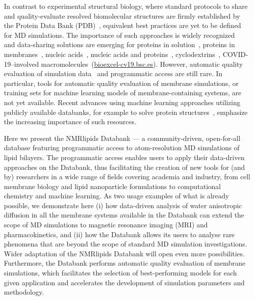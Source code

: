 \documentclass[fleqn,10pt]{wlscirep}
\begin{document}
In contrast to experimental structural biology, where standard protocols to share and quality-evaluate resolved biomolecular structures are firmly established by the Protein Data Bank (PDB)~\cite{montelione13}, equivalent best practices are yet to be defined for MD simulations. The importance of such approaches is widely recognized~\cite{feig99,tai04,silva06,abraham19,hildebrand19,hospital20,abriata20,espigares20} and data-sharing solutions are emerging for proteins in solution~\cite{meyer10,kamp10}, proteins in membranes~\cite{newport19,espigares20,leston22}, nucleic acids~\cite{hospital16}, nucleic acids and proteins~\cite{bekker20}, cyclodextrins~\cite{mixcoha16}, COVID-19--involved macromolecules~(\href{https://bioexcel-cv19.bsc.es}{bioexcel-cv19.bsc.es}). However, automatic quality evaluation of simulation data~\cite{meyer10,hospital16} and programmatic access are still rare. In particular, tools for automatic quality evaluation of membrane simulations, or training sets for machine learning models of membrane-containing systems, are not yet available. Recent advances using machine learning approaches utilizing publicly available databanks, for example to solve protein structures~\cite{jumper21}, emphasize the increasing importance of such resources. 

Here we present the NMRlipids Databank --- a community-driven, open-for-all database featuring programmatic access to atom-resolution MD simulations of lipid bilayers. The programmatic access enables users to apply their data-driven approaches on the Databank, thus facilitating the creation of new tools for (and by) researchers in a wide range of fields covering academia and industry, from cell membrane biology and lipid nanoparticle formulations to computational chemistry and machine learning. As two usage examples of what is already possible, we demonstrate here (i) how data-driven analysis of water anisotropic diffusion in all the membrane systems available in the Databank can extend the scope of MD simulations to magnetic resonance imaging (MRI) and pharmacokinetics, and (ii) how the Databank allows its users to analyse rare phenomena that are beyond the scope of standard MD simulation investigations. Wider adaptation of the NMRlipids Databank will open even more possibilities. Furthermore, the Databank performs automatic quality evaluation of membrane simulations, which facilitates the selection of best-performing models for each given application and accelerates the development of simulation parameters and methodology.  
\end{document}
